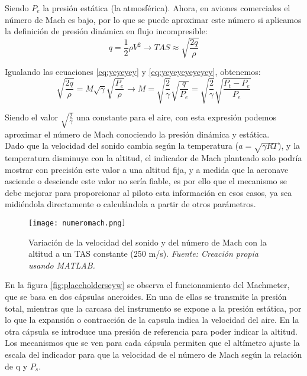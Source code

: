 Siendo \(P_e\) la presión estática (la atmosférica). Ahora, en aviones comerciales el número de Mach es bajo, por lo que se puede aproximar este número si aplicamos la definición de presión dinámica en flujo incompresible:
\begin{equation}
	q = \frac{1}{2} \rho V^{2} \rightarrow TAS \approx \sqrt{\frac{2q}{\rho}}
	\label{eq:yeyeyeyeyeyey}
\end{equation}

Igualando las ecuaciones \ref{eq:yeyeyey} y \ref{eq:yeyeyeyeyeyey}, obtenemos:
\begin{equation}
	\sqrt{\frac{2q}{\rho}} =  M \sqrt{\gamma} \sqrt{\frac{P_e}{\rho}} \rightarrow M = \sqrt{\frac{2}{\gamma}} \sqrt{\frac{q}{P_e}} = \sqrt{\frac{2}{\gamma}} \sqrt{\frac{P_t - P_e}{P_e}}
\end{equation}

Siendo el valor \(\sqrt{\frac{2}{\gamma}}\) una constante para el aire, con esta expresión podemos aproximar el número de Mach conociendo la presión dinámica y estática.\\

Dado que la velocidad del sonido cambia según la temperatura (\(a = \sqrt{\gamma R T}\)), y la temperatura disminuye con la altitud, el indicador de Mach planteado solo podría mostrar con precisión este valor a una altitud fija, y a medida que la aeronave asciende o desciende este valor no sería fiable, es por ello que el mecanismo se debe mejorar para proporcionar al piloto esta información en esos casos, ya sea midiéndola directamente o calculándola a partir de otros parámetros.\\

\begin{figure}[H] 
	\centering
	\texttt{[image: numeromach.png]}
	\caption{\centering Variación de la velocidad del sonido y del número de Mach con la altitud a un TAS constante (250 m/s). \textit{ Fuente: Creación propia usando MATLAB.}}
	\label{fig:grafica}
\end{figure}
		
En la figura \ref{fig:placeholderseyw} se observa el funcionamiento del Machmeter, que se basa en dos cápsulas aneroides. En una de ellas se transmite la presión total, mientras que la carcasa del instrumento se expone a la presión estática, por lo que la expansión o contracción de la capsula indica la velocidad del aire. En la otra cápsula se introduce una presión de referencia para poder indicar la altitud. Los mecanismos que se ven para cada cápsula permiten que el altímetro ajuste la escala del indicador para que la velocidad de el número de Mach según la relación de q y \(P_s\).

